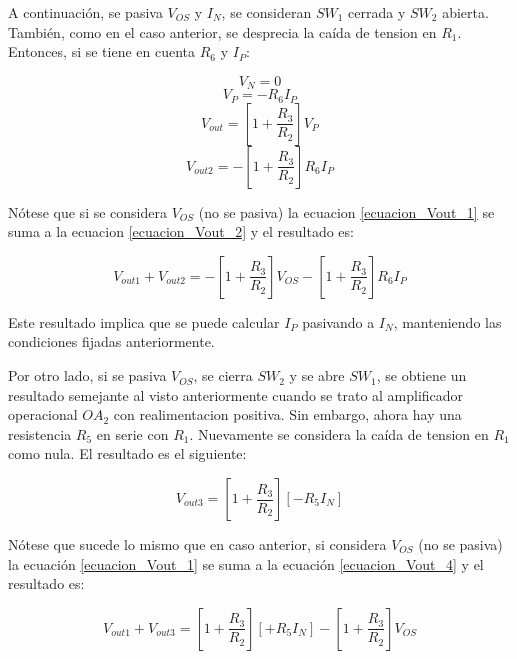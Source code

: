 A continuación, se pasiva $V_{OS}$ y $I_N$, se consideran $SW_1$ cerrada y $SW_2$ abierta. También, como en el caso anterior, se desprecia la caída de tension en $R_1$. 
Entonces, si se tiene en cuenta $R_6$ y $I_P$:

\begin{displaymath} V_{N} = 0 \end{displaymath}
\begin{displaymath} V_{P} = - R_6 I_P \end{displaymath}
\begin{displaymath} V_{out} = [1+\frac{R_3}{R_2}] V_{P} \end{displaymath}  
\begin{equation}  V_{out2} = - [1+\frac{R_3}{R_2}] R_6 I_P \label{ecuacion_Vout_2}\end{equation}
 

Nótese que si se considera $V_{OS}$ (no se pasiva) la ecuacion \ref{ecuacion_Vout_1} se suma a la ecuacion \ref{ecuacion_Vout_2} y el resultado es:

\begin{equation} V_{out1} + V_{out2} = -[1 + \frac{R_3}{R_2}]V_{OS} - [1 + \frac{R_3}{R_2}]R_6I_P \label{ecuacion_Vout_3}\end{equation}

Este resultado implica que se puede calcular $I_P$ pasivando a $I_N$, manteniendo las condiciones fijadas anteriormente.

Por otro lado, si se pasiva $V_{OS}$, se cierra $SW_2$ y se abre $SW_1$, se obtiene un resultado semejante al visto anteriormente cuando se trato al amplificador operacional $OA_2$ con realimentacion positiva.
Sin embargo, ahora hay una resistencia $R_5$ en serie con $R_1$. Nuevamente se considera la caída de tension en $R_1$ como nula. El resultado es el siguiente:

\begin{equation} V_{out3} = [1 + \frac{R_3}{R_2}] [-R_5 I_N ]\label{ecuacion_Vout_4}\end{equation}

Nótese que sucede lo mismo que en caso anterior, si considera $V_{OS}$ (no se pasiva) la ecuación \ref{ecuacion_Vout_1} se suma a la ecuación \ref{ecuacion_Vout_4} y el resultado es:

\begin{equation} V_{out1} + V_{out3} = [1 + \frac{R_3}{R_2}] [+R_5 I_N ]  - [1 + \frac{R_3}{R_2}]V_{OS} \label{ecuacion_Vout_5}\end{equation} %

